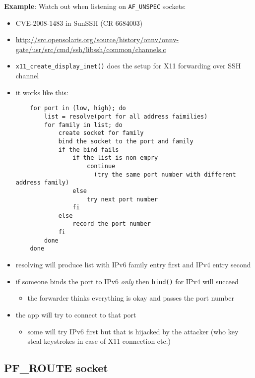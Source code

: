 {\bf Example}: Watch out when listening on \texttt{AF\_UNSPEC} sockets:
\begin{itemize}
  \item CVE-2008-1483 in SunSSH (CR 6684003)
  \item \url{http://src.opensolaris.org/source/history/onnv/onnv-gate/usr/src/cmd/ssh/libssh/common/channels.c}
  \item \texttt{x11\_create\_display\_inet()} does the setup for X11 forwarding
    over SSH channel
  \item it works like this: 
\begin{lstlisting}
    for port in (low, high); do
        list = resolve(port for all address faimilies)
        for family in list; do
            create socket for family
            bind the socket to the port and family
            if the bind fails
                if the list is non-empry
                    continue
                      (try the same port number with different address family)
                else
                    try next port number
                fi
            else
                record the port number
            fi
        done
    done
\end{lstlisting}
  \item resolving will produce list with IPv6 family entry first and IPv4
    entry second
  \item if someone binds the port to IPv6 \emph{only} then \texttt{bind()}
    for IPv4 will succeed
    \begin{itemize}
    \item the forwarder thinks everything is okay and passes the port number
    \end{itemize}
  \item the app will try to connect to that port
    \begin{itemize}
    \item some will try IPv6 first but that is hijacked by the attacker
      (who key steal keystrokes in case of X11 connection etc.)
    \end{itemize}
\end{itemize}




\subsection{PF\_ROUTE socket}

